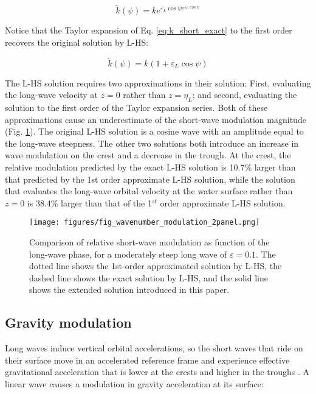 \documentclass[draft]{agujournal2019}
\begin{document}
\begin{equation}
\label{eq:k_short_exact}
\widetilde{k}(\psi) = k e^{\varepsilon_L \cos{\psi} e^{\varepsilon_L \cos{\psi}}}
\end{equation}

Notice that the Taylor expansion of Eq. \ref{eq:k_short_exact} to the first order
recovers the original solution by L-HS:

\begin{equation}
\label{eq:k_short_lhs}
\widetilde{k}(\psi) = k (1 + \varepsilon_L \cos{\psi})
\end{equation}

The L-HS solution requires two approximations in their solution:
First, evaluating the long-wave velocity at $z = 0$
rather than $z = \eta_L$; and second, evaluating the solution to the first order
of the Taylor expansion series.
Both of these approximations cause an underestimate of the short-wave
modulation magnitude (Fig. \ref{fig:wavenumber_modulation}).
The original L-HS solution is a cosine wave with an amplitude equal
to the long-wave steepness.
The other two solutions both introduce an increase in wave modulation
on the crest and a decrease in the trough.
At the crest, the relative modulation predicted by the exact L-HS solution
is 10.7\% larger than that predicted by the 1st order approximate L-HS
solution, while the solution that evaluates the long-wave orbital velocity
at the water surface rather than $z = 0$ is 38.4\% larger than that of the
1$^{st}$ order approximate L-HS solution.

\begin{figure}[h]
\label{fig:wavenumber_modulation}
\centering
\texttt{[image: figures/fig\_wavenumber\_modulation\_2panel.png]}
\caption{
  Comparison of relative short-wave modulation as function of the
  long-wave phase, for a moderately steep long wave of $\varepsilon = 0.1$.
  The dotted line shows the 1st-order approximated solution by L-HS,
  the dashed line shows the exact solution by L-HS,
  and the solid line shows the extended solution introduced in this paper.
}
\end{figure}


\subsection{Gravity modulation}
\label{subsection:gravity_modulation}

Long waves induce vertical orbital accelerations, so the short
waves that ride on their surface move in an accelerated reference frame and
experience effective gravitational acceleration that is lower at the crests and
higher in the troughs \cite{longuet1986eulerian,longuet1987propagation}.
A linear wave causes a modulation in gravity acceleration at its surface:
\end{document}
